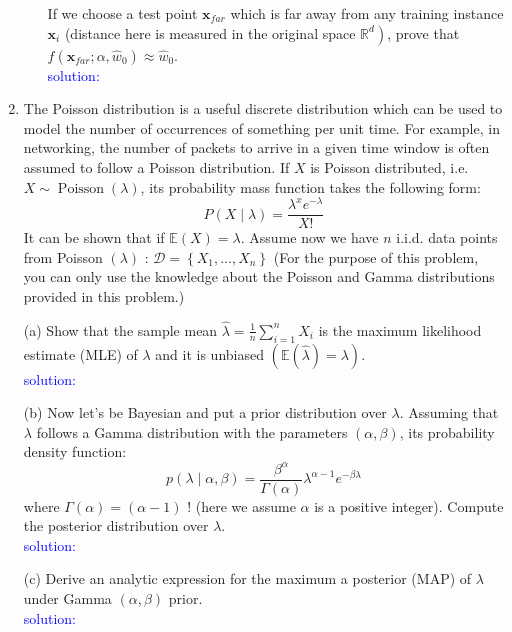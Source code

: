 \documentclass[10pt]{article}
\begin{document}
\begin{enumerate}[1.]
\begin{itemize}
If we choose a test point $\mathbf{x}_{f a r}$ which is far away from any training instance $\mathbf{x}_i$ (distance here is measured in the original space $\left.\mathbb{R}^d\right)$, prove that $f\left(\mathbf{x}_{f a r} ; \alpha, \hat{w}_0\right) \approx \hat{w}_0$.
\\
\textcolor{blue}{solution:}

\end{itemize}
\newpage
\item {}The Poisson distribution is a useful discrete distribution which can be used to model the number of occurrences of something per unit time. For example, in networking, the number of packets to arrive in a given time window is often assumed to follow a Poisson distribution. If $X$ is Poisson distributed, i.e. $X \sim \operatorname{Poisson}(\lambda)$, its probability mass function takes the following form:
$$
P(X \mid \lambda)=\frac{\lambda^x e^{-\lambda}}{X !}
$$
It can be shown that if $\mathbb{E}(X)=\lambda$. Assume now we have $n$ i.i.d. data points from Poisson $(\lambda)$ : $\mathcal{D}=\left\{X_1, \ldots, X_n\right\}$
(For the purpose of this problem, you can only use the knowledge about the Poisson and Gamma distributions provided in this problem.)
\item[(a)] Show that the sample mean $\hat{\lambda}=\frac{1}{n} \sum_{i=1}^n X_i$ is the maximum likelihood estimate (MLE) of $\lambda$ and it is unbiased $(\mathbb{E}(\hat{\lambda})=\lambda)$. 
\\
\textcolor{blue}{solution:}


\item[(b)]Now let's be Bayesian and put a prior distribution over $\lambda$. Assuming that $\lambda$ follows a Gamma distribution with the parameters $(\alpha, \beta)$, its probability density function:
$$
p(\lambda \mid \alpha, \beta)=\frac{\beta^\alpha}{\Gamma(\alpha)} \lambda^{\alpha-1} e^{-\beta \lambda}
$$
where $\Gamma(\alpha)=(\alpha-1)$ ! (here we assume $\alpha$ is a positive integer). Compute the posterior distribution over $\lambda$. 
\\
\textcolor{blue}{solution:}
\item[(c)] Derive an analytic expression for the maximum a posterior (MAP) of $\lambda$ under Gamma $(\alpha, \beta)$ prior.
\\
\textcolor{blue}{solution:}





\end{enumerate}
\end{document}
